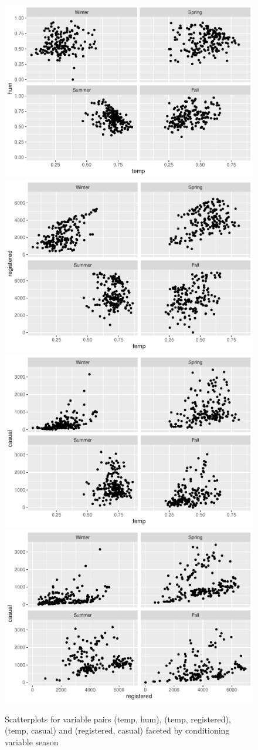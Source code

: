 \begin{figure}
\includegraphics[width=0.5\linewidth]{rjpaperCHMar22_files/figure-latex/int-pairs-conditional-1} \includegraphics[width=0.5\linewidth]{rjpaperCHMar22_files/figure-latex/int-pairs-conditional-2} \includegraphics[width=0.5\linewidth]{rjpaperCHMar22_files/figure-latex/int-pairs-conditional-3} \includegraphics[width=0.5\linewidth]{rjpaperCHMar22_files/figure-latex/int-pairs-conditional-4} \caption{Scatterplots for variable pairs (temp, hum), (temp, registered), (temp, casual) and (registered, casual) faceted by conditioning variable season}\label{fig:int-pairs-conditional}
\end{figure}

